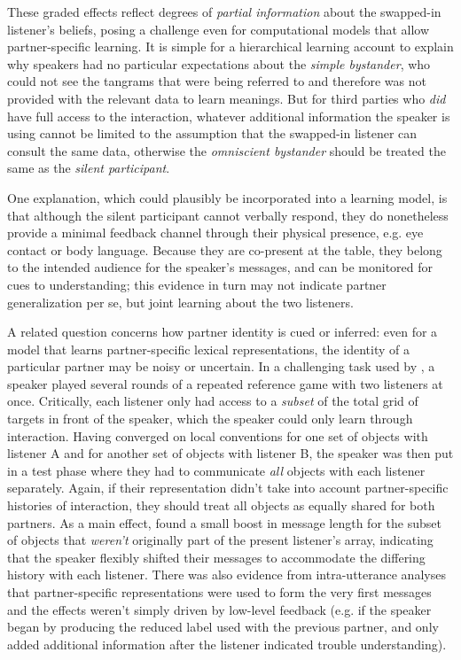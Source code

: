 \documentclass[11pt, floatsintext, jou]{apa6}
\begin{document}
These graded effects reflect degrees of \emph{partial information} about the swapped-in listener's beliefs, posing a challenge even for computational models that allow partner-specific learning. It is simple for a hierarchical learning account to explain why speakers had no particular expectations about the \emph{simple bystander}, who could not see the tangrams that were being referred to and therefore was not provided with the relevant data to learn meanings. But for third parties who \emph{did} have full access to the interaction, whatever additional information the speaker is using cannot be limited to the assumption that the swapped-in listener can consult the same data, otherwise the \emph{omniscient bystander} should be treated the same as the \emph{silent participant}. 

One explanation, which could plausibly be incorporated into a learning model, is that although the silent participant cannot verbally respond, they do nonetheless provide a minimal feedback channel through their physical presence, e.g. eye contact or body language. Because they are co-present at the table, they belong to the intended audience for the speaker's messages, and can be monitored for cues to understanding; this evidence in turn may not indicate partner generalization per se, but joint learning about the two listeners. 

A related question concerns how partner identity is cued or inferred: even for a model that learns partner-specific lexical representations, the identity of a particular partner may be noisy or uncertain. In a challenging task used by , a speaker played several rounds of a repeated reference game with two listeners at once. Critically, each listener only had access to a \emph{subset} of the total grid of targets in front of the speaker, which the speaker could only learn through interaction. Having converged on local conventions for one set of objects with listener A and for another set of objects with listener B, the speaker was then put in a test phase where they had to communicate \emph{all} objects with each listener separately. Again, if their representation didn't take into account partner-specific histories of interaction, they should treat all objects as equally shared for both partners. As a main effect,  found a small boost in message length for the subset of objects that \emph{weren't} originally part of the present listener's array, indicating that the speaker flexibly shifted their messages to accommodate the differing history with each listener. There was also evidence from intra-utterance analyses that partner-specific representations were used to form the very first messages and the effects weren't simply driven by low-level feedback (e.g. if the speaker began by producing the reduced label used with the previous partner, and only added additional information after the listener indicated trouble understanding). 
\end{document}
